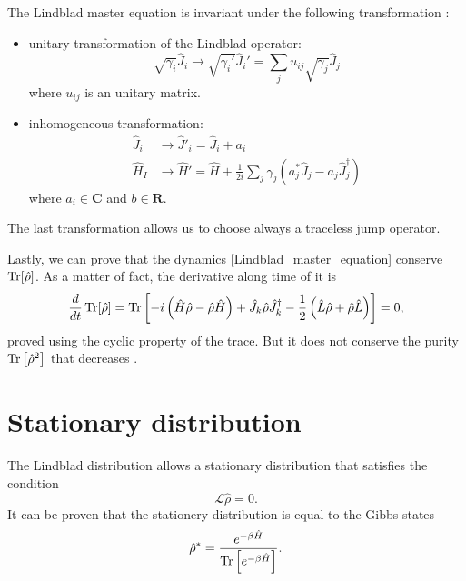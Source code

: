 The Lindblad master equation is invariant under the following transformation \cite{Breuer-Petruccione}:
\begin{itemize}
    \item unitary transformation of the Lindblad operator:
        \begin{equation}
            \sqrt{\gamma_i}\hat J_i \rightarrow \sqrt{\gamma_i'}\hat J_i' = \sum_j u_{ij}\sqrt{\gamma_j}\hat J_j
        \end{equation}
        where $u_{ij}$ is an unitary matrix.
    \item inhomogeneous transformation:
        \begin{equation}
            \begin{split}
                \hat J_i &\rightarrow \hat J'_i = \hat J_i + a_i\\
                \hat H_I &\rightarrow \hat H' = \hat H + \frac{1}{2i}\sum_j\gamma_j\left(a^*_j\hat J_j -a_j\hat J_j^\dagger\right)
            \end{split}
        \end{equation}
        where $a_i \in\mathbf{C}$ and $b \in \mathbf{R}$.
\end{itemize}
The last transformation allows us to choose always a traceless jump operator.

Lastly, we can prove that the dynamics \eqref{Lindblad_master_equation} conserve $\operatorname{Tr}[\hat\rho]$. As a matter of fact, the derivative along time of it is
\begin{equation}\label{Lindblad_master_equation}
    \frac{d}{dt}\operatorname{Tr}[\hat\rho] = \operatorname{Tr}\left[-i\left(\hat H\hat\rho - \hat\rho\hat H \right) +  \hat J_k \hat\rho \hat J_k^\dagger -\frac{1}{2} \left(\hat L\hat\rho + \hat\rho\hat L\right)\right] = 0,
\end{equation}
proved using the cyclic property of the trace. But it does not conserve the purity $\operatorname{Tr}\left[\hat\rho^2\right]$ that decreases \cite{Manzano}. 


\section{Stationary distribution}
The Lindblad distribution allows a stationary distribution that satisfies the condition
\begin{equation}
    \mathcal{L}\hat\rho = 0.
\end{equation}
It can be proven that the stationery distribution is equal to the Gibbs states \cite{Breuer-Petruccione}
\begin{equation}
    \hat\rho^* = \frac{e^{-\beta \hat H}}{\operatorname{Tr}\left[e^{-\beta \hat H}\right]}.
\end{equation}

